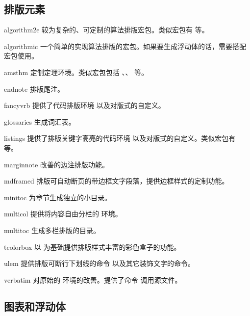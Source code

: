 \subsection{排版元素}\label{subsec:pkg-elements}

\begin{pkglist}
  \item[algorithm2e] 较为复杂的、可定制的算法排版宏包。类似宏包有  等。
  \item[algorithmic] 一个简单的实现算法排版的宏包。如果要生成浮动体的话，需要搭配  宏包使用。
  \item[amsthm]      定制定理环境。类似宏包包括 、、 等。
  \item[endnote]     排版尾注。
  \item[fancyvrb]    提供了代码排版环境  以及对版式的自定义。
  \item[glossaries]  生成词汇表。
  \item[listings]    提供了排版关键字高亮的代码环境  以及对版式的自定义。类似宏包有  等。
  \item[marginnote]  改善的边注排版功能。
  \item[mdframed]    排版可自动断页的带边框文字段落，提供边框样式的定制功能。
  \item[minitoc]     为章节生成独立的小目录。
  \item[multicol]    提供将内容自由分栏的  环境。
  \item[multitoc]    生成多栏排版的目录。
  \item[tcolorbox]   以  为基础提供排版样式丰富的彩色盒子的功能。
  \item[ulem]        提供排版可断行下划线的命令  以及其它装饰文字的命令。
  \item[verbatim]    对原始的  环境的改善。提供了命令  调用源文件。
\end{pkglist}

\subsection{图表和浮动体}\label{subsec:pkg-tab-fig}

